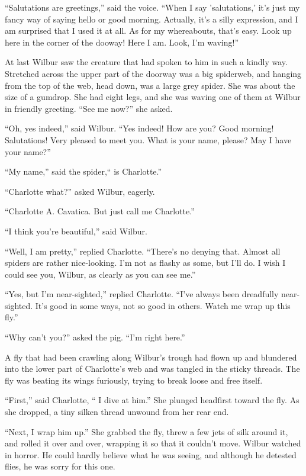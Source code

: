 \documentclass[a4paper, oneside]{book}
\begin{document}
``Salutations are greetings,'' said the voice. ``When I say
'salutations,' it's just my fancy way of saying hello or good morning.
Actually, it's a silly expression, and I am surprised that I used it at
all. As for my whereabouts, that's easy. Look up here in the corner
of the dooway! Here I am. Look, I'm waving!''

 At last Wilbur saw the creature that had spoken to him in such a
kindly way. Stretched across the upper part of the doorway was a
big spiderweb, and hanging from the top of the web, head down,
was a large grey spider. She was about the size of a gumdrop. She
had eight legs, and she was waving one of them at Wilbur in
friendly greeting. ``See me now?'' she asked. 

``Oh, yes indeed,'' said Wilbur. ``Yes indeed! How are you? Good
morning! Salutations! Very pleased to meet you. What is your
name, please? May I have your name?''

 ``My name,'' said the spider,`` is Charlotte.''

 ``Charlotte what?'' asked Wilbur, eagerly.

 ``Charlotte A. Cavatica. But just call me Charlotte.''

 ``I think you're beautiful,'' said Wilbur.

 ``Well, I am pretty,'' replied Charlotte. ``There's no denying that.
Almost all spiders are rather nice-looking. I'm not as flashy as
some, but I'll do. I wish I could see you, Wilbur, as clearly as you
can see me.''

 ``Yes, but I'm near-sighted,'' replied Charlotte. ``I've always
been dreadfully near-sighted. It's good in some ways, not so good
in others. Watch me wrap up this fly.''

``Why can't you?'' asked the pig. ``I'm right here.'' 

  A fly that had been crawling along Wilbur's trough had flown up
and blundered into the lower part of Charlotte's web and was
tangled in the sticky threads. The fly was beating its wings
furiously, trying to break loose and free itself. 

 ``First,'' said Charlotte, `` I dive at him.'' She plunged headfirst
toward the fly. As she dropped, a tiny silken thread unwound from
her rear end.

 ``Next, I wrap him up.'' She grabbed the fly, threw a few jets of silk
around it, and rolled it over and over, wrapping it so that it
couldn't move. Wilbur watched in horror. He could hardly believe
what he was seeing, and although he detested flies, he was sorry for
this one.
\end{document}
